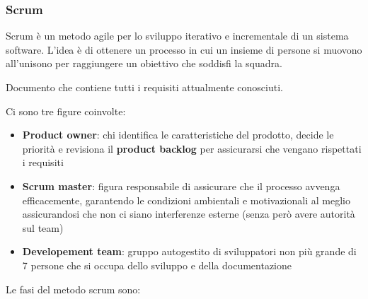 \subsubsection{Scrum}
Scrum è un metodo agile per lo sviluppo iterativo e incrementale di un sistema software. L'idea è di ottenere un processo in cui un insieme di persone si muovono all'unisono per raggiungere un obiettivo che soddisfi la squadra.
\begin{definition}
	Documento che contiene tutti i requisiti attualmente conosciuti.
\end{definition}
Ci sono tre figure coinvolte:
\begin{itemize}
	\item \textbf{Product owner}: chi identifica le caratteristiche del prodotto, decide le priorità e revisiona il \textbf{product backlog} per assicurarsi che vengano rispettati i requisiti
	\item \textbf{Scrum master}: figura responsabile di assicurare che il processo avvenga efficacemente, garantendo le condizioni ambientali e motivazionali al meglio assicurandosi che non ci siano interferenze esterne (senza però avere autorità sul team)
	\item \textbf{Developement team}: gruppo autogestito di sviluppatori non più grande di 7 persone che si occupa dello sviluppo e della documentazione
\end{itemize}
Le fasi del metodo scrum sono:
